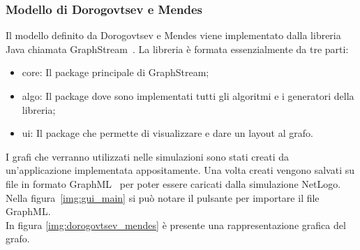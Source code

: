\subsubsection{Modello di Dorogovtsev e Mendes}
Il modello definito da Dorogovtsev e Mendes viene implementato dalla libreria Java chiamata GraphStream~\cite{biblio:graphstream}.
La libreria è formata essenzialmente da tre parti: 
\begin{itemize}
 \item core: Il package principale di GraphStream;
 \item algo: Il package dove sono implementati tutti gli algoritmi e i generatori della libreria;
 \item ui: Il package che permette di visualizzare e dare un layout al grafo.
\end{itemize}
I grafi che verranno utilizzati nelle simulazioni sono stati creati da un'applicazione implementata appositamente.
Una volta creati vengono salvati su file in formato GraphML~\cite{biblio:graphml} per poter 
essere caricati dalla simulazione NetLogo. 
Nella figura~\ref{img:gui_main} si può notare il pulsante per importare il file GraphML.\\
In figura \ref{img:dorogovtsev_mendes} è presente una rappresentazione grafica del grafo.

